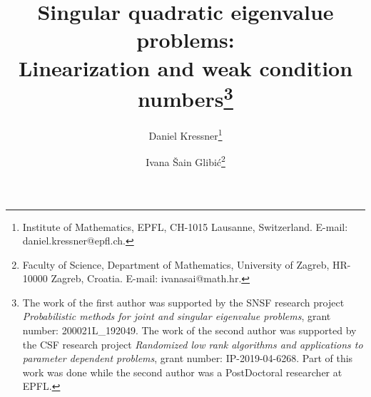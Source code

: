 \documentclass[12pt]{article}
\title{Singular quadratic eigenvalue problems: \\ Linearization and weak condition numbers\footnote{The work of the first author was supported by the SNSF research project \emph{Probabilistic methods for joint and singular eigenvalue problems}, grant number: 200021L\_192049. The work of the second author was supported by the CSF research project \emph{Randomized low rank algorithms and applications to parameter dependent problems}, grant number: IP-2019-04-6268. Part of this work was
done while the second author was a PostDoctoral researcher at EPFL.}}
\date{}
\author{
  Daniel Kressner\footnote{Institute of Mathematics, EPFL, CH-1015 Lausanne, Switzerland. E-mail: daniel.kressner@epfl.ch.} 
  \and
  Ivana \v{S}ain Glibi\'{c}\footnote{Faculty of Science, Department of Mathematics, University of Zagreb, HR-10000 Zagreb, Croatia. E-mail: ivanasai@math.hr.}
}
\begin{document}
\maketitle

\end{document}
